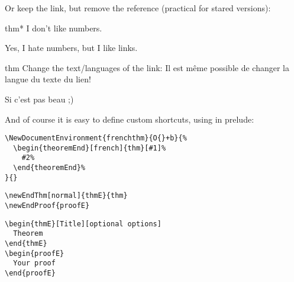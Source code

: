 \documentclass{article}
\begin{document}
Or keep the link, but remove the reference (practical for stared versions):
\begin{theoremEnd}[stared]{thm*}
  I don't like numbers.
\end{theoremEnd}
\begin{proofEnd}
  Yes, I hate numbers, but I like links.
\end{proofEnd}


\begin{theoremEnd}[french]{thm}%
  Change the text/languages of the link: Il est même possible de changer la langue du texte du lien!  
\end{theoremEnd}
\begin{proofEnd}
  Si c'est pas beau ;)
\end{proofEnd}

And of course it is easy to define custom shortcuts, using in prelude:
\begin{verbatim}
\NewDocumentEnvironment{frenchthm}{O{}+b}{%
  \begin{theoremEnd}[french]{thm}[#1]%
    #2%
  \end{theoremEnd}%
}{}
\end{verbatim}

\newsavebox{\myEndBox}

\begin{lrbox}{\myEndBox}
  \begin{minipage}{1.0\linewidth}
\begin{verbatim}
\newEndThm[normal]{thmE}{thm}
\newEndProof{proofE}
\end{verbatim}
  \end{minipage}
\end{lrbox}

\newsavebox{\myEndBoxB}

\begin{lrbox}{\myEndBoxB}
  \begin{minipage}{1.0\linewidth}
\begin{verbatim}
\begin{thmE}[Title][optional options]
  Theorem
\end{thmE}
\begin{proofE}
  Your proof
\end{proofE}
\end{verbatim}
  \end{minipage}
\end{lrbox}
   
\end{document}
